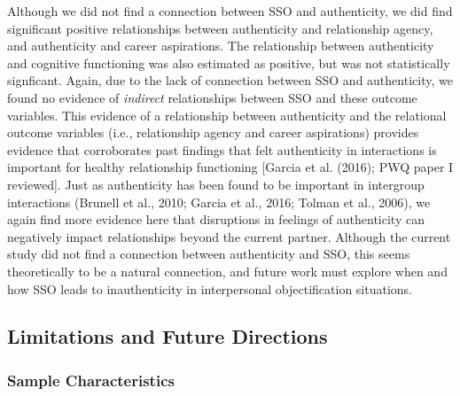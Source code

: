 \documentclass[man]{apa6}
\begin{document}
Although we did not find a connection between SSO and authenticity, we
did find significant positive relationships between authenticity and
relationship agency, and authenticity and career aspirations. The
relationship between authenticity and cognitive functioning was also
estimated as positive, but was not statistically signficant. Again, due
to the lack of connection between SSO and authenticity, we found no
evidence of \emph{indirect} relationships between SSO and these outcome
variables. This evidence of a relationship between authenticity and the
relational outcome variables (i.e., relationship agency and career
aspirations) provides evidence that corroborates past findings that felt
authenticity in interactions is important for healthy relationship
functioning {[}Garcia et al. (2016); PWQ paper I reviewed{]}. Just as
authenticity has been found to be important in intergroup interactions
(Brunell et al., 2010; Garcia et al., 2016; Tolman et al., 2006), we
again find more evidence here that disruptions in feelings of
authenticity can negatively impact relationships beyond the current
partner. Although the current study did not find a connection between
authenticity and SSO, this seems theoretically to be a natural
connection, and future work must explore when and how SSO leads to
inauthenticity in interpersonal objectification situations.

\subsection{Limitations and Future
Directions}\label{limitations-and-future-directions}

\subsubsection{Sample Characteristics}\label{sample-characteristics}
\end{document}
